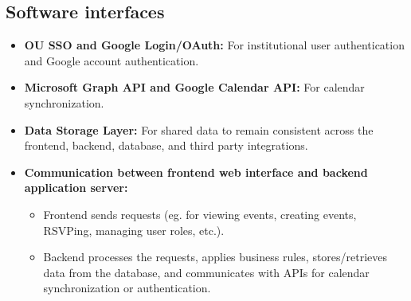 \subsection{Software interfaces}

\begin{itemize}
    \item \textbf{OU SSO and Google Login/OAuth:} For institutional user
    authentication and Google account authentication.
    
    \item \textbf{Microsoft Graph API and Google Calendar API:} For calendar
    synchronization.
    
    \item \textbf{Data Storage Layer:} For shared data to remain consistent
    across the frontend, backend, database, and third party integrations.
    
    \item \textbf{Communication between frontend web interface and backend
    application server:}
    \begin{itemize}
        \item Frontend sends requests (eg. for viewing events, creating events,
        RSVPing, managing user roles, etc.).
        
        \item Backend processes the requests, applies business rules,
        stores/retrieves data from the database, and communicates with APIs for
        calendar synchronization or authentication.
    \end{itemize}
\end{itemize}
